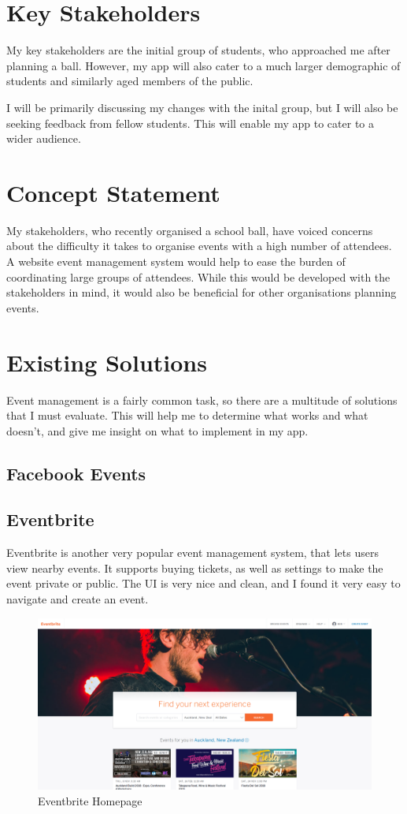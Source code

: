 \documentclass[12pt, draft]{report}
\begin{document}
	\section{Key Stakeholders}
	My key stakeholders are the initial group of students, who approached me after planning a ball. However, my app will also cater to a much larger demographic of students and similarly aged members of the public.

	I will be primarily discussing my changes with the inital group, but I will also be seeking feedback from fellow students. This will enable my app to cater to a wider audience.

	\section{Concept Statement}
	My stakeholders, who recently organised a school ball, have voiced concerns about the difficulty it takes to organise events with a high number of attendees. A website event management system would help to ease the burden of coordinating large groups of attendees. While this would be developed with the stakeholders in mind, it would also be beneficial for other organisations planning events.

	\section{Existing Solutions}
	Event management is a fairly common task, so there are a multitude of solutions that I must evaluate. This will help me to determine what works and what doesn't, and give me insight on what to implement in my app.

	\subsection{Facebook Events}

	\subsection{Eventbrite}
	Eventbrite is another very popular event management system, that lets users view nearby events.
	It supports buying tickets, as well as settings to make the event private or public. The UI is very nice and clean, and I found it very easy to navigate and create an event.

	\begin{figure}[H]
		\caption{Eventbrite Homepage}
		\includegraphics[width=\linewidth]{static/eventbrite-home.png}
	\end{figure}
\end{document}
